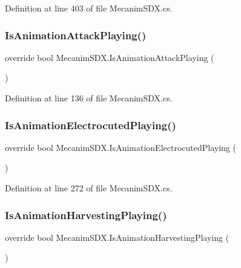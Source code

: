 Definition at line 403 of file Mecanim\+S\+D\+X.\+cs.

\mbox{\label{class_mecanim_s_d_x_a1b94f6f47f059463f95ae6d61c80a565}} 
\subsubsection{\texorpdfstring{IsAnimationAttackPlaying()}{IsAnimationAttackPlaying()}}
{\footnotesize\ttfamily override bool Mecanim\+S\+D\+X.\+Is\+Animation\+Attack\+Playing (\begin{DoxyParamCaption}{ }\end{DoxyParamCaption})}



Definition at line 136 of file Mecanim\+S\+D\+X.\+cs.

\mbox{\label{class_mecanim_s_d_x_a00c9160c184e2c78a3ec4ef8bd9b0c83}} 
\subsubsection{\texorpdfstring{IsAnimationElectrocutedPlaying()}{IsAnimationElectrocutedPlaying()}}
{\footnotesize\ttfamily override bool Mecanim\+S\+D\+X.\+Is\+Animation\+Electrocuted\+Playing (\begin{DoxyParamCaption}{ }\end{DoxyParamCaption})}



Definition at line 272 of file Mecanim\+S\+D\+X.\+cs.

\mbox{\label{class_mecanim_s_d_x_a453c7d9636ac85f8bc1eec14f9b9684b}} 
\subsubsection{\texorpdfstring{IsAnimationHarvestingPlaying()}{IsAnimationHarvestingPlaying()}}
{\footnotesize\ttfamily override bool Mecanim\+S\+D\+X.\+Is\+Animation\+Harvesting\+Playing (\begin{DoxyParamCaption}{ }\end{DoxyParamCaption})}



